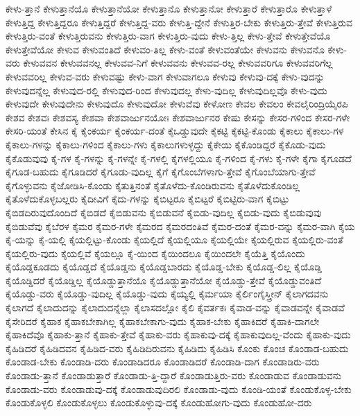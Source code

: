{ಕೇಳು-ತ್ತಾನೆ
ಕೇಳುತ್ತಾನೆಯೊ
ಕೇಳುತ್ತಾನೆಯೋ
ಕೇಳುತ್ತಾನೊ
ಕೇಳುತ್ತಾನೋ
ಕೇಳುತ್ತಾರೆ
ಕೇಳುತ್ತಾರೊ
ಕೇಳುತ್ತಾಳೆ
ಕೇಳುತ್ತಿದ್ದ
ಕೇಳುತ್ತಿದ್ದರೂ
ಕೇಳುತ್ತಿದ್ದರೆ
ಕೇಳುತ್ತಿದ್ದ-ವರು
ಕೇಳುತ್ತಿ-ದ್ದೇನೆ
ಕೇಳುತ್ತಿರ-ಬೇಕು
ಕೇಳುತ್ತಿರು-ತ್ತೇವೆ
ಕೇಳುತ್ತಿರುವ
ಕೇಳುತ್ತಿರು-ವಂತೆ
ಕೇಳುತ್ತಿರುವನು
ಕೇಳುತ್ತಿರು-ವಾಗ
ಕೇಳುತ್ತಿರು-ವುದು
ಕೇಳು-ತ್ತಿಲ್ಲ
ಕೇಳು-ತ್ತೇವೆ
ಕೇಳುತ್ತೇವೆಯೊ
ಕೇಳುತ್ತೇವೆಯೋ
ಕೇಳುವ
ಕೇಳುವಂತಿದೆ
ಕೇಳುವಂ-ತಿಲ್ಲ
ಕೇಳು-ವಂತೆ
ಕೇಳುವಂತೆಯೇ
ಕೇಳುವನು
ಕೇಳುವನೊ
ಕೇಳು-ವರು
ಕೇಳುವವನ
ಕೇಳುವವನಲ್ಲ
ಕೇಳುವವ-ನಿಗೆ
ಕೇಳುವವನು
ಕೇಳುವವ-ರಲ್ಲ
ಕೇಳುವವರಿಗೂ
ಕೇಳುವವರಿಗೆಲ್ಲ
ಕೇಳುವವರಿಲ್ಲ
ಕೇಳುವ-ವರು
ಕೇಳುವಷ್ಟು
ಕೇಳು-ವಾಗ
ಕೇಳುವಾಗಲೂ
ಕೇಳುವು
ಕೇಳುವು-ದಕ್ಕೆ
ಕೇಳು-ವುದನ್ನು
ಕೇಳುವುದನ್ನೆಲ್ಲ
ಕೇಳುವುದ-ರಲ್ಲಿ
ಕೇಳುವುದ-ರಿಂದ
ಕೇಳುವುದಲ್ಲ
ಕೇಳು-ವುದಿಲ್ಲ
ಕೇಳುವುದಿಲ್ಲವೊ
ಕೇಳು-ವುದು
ಕೇಳುವುದೇ
ಕೇಳುವುದೇನು
ಕೇಳುವುದೊ
ಕೇಳುವುದೋ
ಕೇಳುವೆವು
ಕೇಳೋಣ
ಕೇವಲ
ಕೇವಲಂ
ಕೇವಲೈರಿಂದ್ರಿಯೈರಪಿ
ಕೇಶವ
ಕೇಶವಃ
ಕೇಶವಸ್ಯ
ಕೇಶವಾ
ಕೇಶವಾರ್ಜುನಯೋಃ
ಕೇಶವಾರ್ಜುನರ
ಕೇಷು
ಕೇಸನ್ನು
ಕೇಸರ-ಗಳಿಂದ
ಕೇಸರ-ಗಳೇ
ಕೇಸರಿ-ಯಂತೆ
ಕೇಸಿನ
ಕೈ
ಕೈಂಕರ್ಯ
ಕೈಂಕರ್ಯ-ದಂತೆ
ಕೈಒಡ್ಡುವುದೇ
ಕೈಕಟ್ಟಿ
ಕೈಕಟ್ಟಿ-ಕೊಂಡು
ಕೈಕಾಲು
ಕೈಕಾಲು-ಗಳ
ಕೈಕಾಲು-ಗಳನ್ನು
ಕೈಕಾಲು-ಗಳಿಂದ
ಕೈಕಾಲು-ಗಳು
ಕೈಕಾಲುಗಳುಳ್ಳದ್ದು
ಕೈಕೇಯಿ
ಕೈಕೊಂಡಿದ್ದರೆ
ಕೈಕೊಡು-ವುದು
ಕೈಕೊಡುವುವು
ಕೈ-ಗಳ
ಕೈ-ಗಳನ್ನು
ಕೈ-ಗಳನ್ನೇ
ಕೈ-ಗಳಲ್ಲಿ
ಕೈಗಳಲ್ಲಿಯೂ
ಕೈ-ಗಳಿಂದ
ಕೈ-ಗಳು
ಕೈ-ಗಳೇ
ಕೈಗಾ
ಕೈಗೂಡದೆ
ಕೈಗೂಡ-ಬಹುದು
ಕೈಗೂಡಿದರೆ
ಕೈಗೂಡು-ವುದಿಲ್ಲ
ಕೈಗೆ
ಕೈಗೊಂಬೆಗಳಾಗು-ತ್ತೇವೆ
ಕೈಗೊಂಬೆಯಾಗು-ತ್ತೇವೆ
ಕೈಗೊಳ್ಳುವನು
ಕೈಜೋಡಿಸಿ-ಕೊಂಡು
ಕೈತುತ್ತಿನಂತೆ
ಕೈತೊಳೆದು-ಕೊಂಡಿರುವನು
ಕೈತೊಳೆದುಕೊಂಡಿಲ್ಲ
ಕೈತೊಳೆದುಕೊಳ್ಳಬಲ್ಲರು
ಕೈದೀವಿಗೆ
ಕೈದು-ಗಳನ್ನು
ಕೈಬಿಟ್ಟರೂ
ಕೈಬಿಟ್ಟರೆ
ಕೈಬಿಟ್ಟಿರು-ವಾಗ
ಕೈಬಿಟ್ಟು
ಕೈಬಿಡದಿರುವುದೊಂದಿದೆ
ಕೈಬಿಡದೆ
ಕೈಬಿಡುವನು
ಕೈಬಿಡುವನೆ
ಕೈಬಿಡು-ವುದಿಲ್ಲ
ಕೈಬಿಡು-ವುದು
ಕೈಬಿಡುವುವು
ಕೈಬಿಡುವೆವು
ಕೈಬೆರಳ
ಕೈಮರ
ಕೈಮರ-ಗಳೇ
ಕೈಮರದ
ಕೈಮರದಂತಿವೆ
ಕೈಮರ-ದಂತೆ
ಕೈಮರ-ವನ್ನು
ಕೈಮರ-ವಾಗಿ
ಕೈಯ
ಕೈ-ಯನ್ನು
ಕೈ-ಯಲ್ಲಿ
ಕೈಯಲ್ಲಿಟ್ಟು-ಕೊಂಡು
ಕೈಯಲ್ಲಿದೆ
ಕೈಯಲ್ಲಿಯೂ
ಕೈಯಲ್ಲಿಯೇ
ಕೈಯಲ್ಲಿರುವ
ಕೈಯಲ್ಲಿರು-ವಂತೆ
ಕೈಯಲ್ಲಿರು-ವುದು
ಕೈಯಲ್ಲಿವೆ
ಕೈಯಲ್ಲೂ
ಕೈ-ಯಿಂದ
ಕೈಯಿಂದಲೂ
ಕೈಯಿಂದಲೇ
ಕೈಯೆತ್ತಿ
ಕೈಯೊಂದು
ಕೈಯೊಡ್ಡಕೂಡದು
ಕೈಯೊಡ್ಡದೆ
ಕೈಯೊಡ್ಡನು
ಕೈಯೊಡ್ಡಬಾರದು
ಕೈಯೊಡ್ಡ-ಬೇಕು
ಕೈಯೊಡ್ಡ-ಲಿಲ್ಲ
ಕೈಯೊಡ್ಡಿ
ಕೈಯೊಡ್ಡಿದರೆ
ಕೈಯೊಡ್ಡಿಲ್ಲ
ಕೈಯೊಡ್ಡುತ್ತಾನೆಯೊ
ಕೈಯೊಡ್ಡುತ್ತಾನೆಯೋ
ಕೈಯೊಡ್ಡು-ತ್ತೇವೆ
ಕೈಯೊಡ್ಡುವಂತಿದೆ
ಕೈಯೊಡ್ಡು-ವರು
ಕೈಯೊಡ್ಡು-ವುದಿಲ್ಲ
ಕೈಯೊಡ್ಡು-ವುದು
ಕೈಯ್ಯಲ್ಲಿ
ಕೈರ್ಮಯಾ
ಕೈರ್ಲಿಂಗೈಸ್ತ್ರೀನ್
ಕೈಲಾಗದವನು
ಕೈಲಾಗದೆ
ಕೈಲಾದುದನ್ನು
ಕೈಲಾದುದನ್ನೆಲ್ಲಾ
ಕೈಲಾಸದಲ್ಲೋ
ಕೈಲಿ
ಕೈವರ್ತಕಃ
ಕೈವಾಡ-ವನ್ನು
ಕೈವಾಡವನ್ನೇ
ಕೈವಾಡವೆ
ಕೈಸೇರಿದರೆ
ಕೈಹಾಕ
ಕೈಹಾಕಬೇಕಾಗಿಲ್ಲ
ಕೈಹಾಕಬೇಕಾಗು-ವುದು
ಕೈಹಾಕ-ಬೇಕು
ಕೈಹಾಕಿದರೆ
ಕೈಹಾಕಿ-ದಾಗಲೇ
ಕೈಹಾಕಿದೆವೊ
ಕೈಹಾಕು-ತ್ತಾನೆ
ಕೈಹಾಕು-ತ್ತೇವೆ
ಕೈಹಾಕು-ವರು
ಕೈಹಾಕುವು-ದಕ್ಕೆ
ಕೈಹಾಕುವುದಿಲ್ಲ-ವೆಂದು
ಕೈಹಾಕು-ವುದು
ಕೈಹಿಡಿದರೆ
ಕೈಹಿಡಿದವನ
ಕೈಹಿಡಿದ-ವರು
ಕೈಹಿಡಿದಿರುವನು
ಕೈಹಿಡಿದು
ಕೈಹಿಡಿಸಿ
ಕೊಂಕು
ಕೊಂಚ
ಕೊಂಡಾಡ-ಬಹುದು
ಕೊಂಡಾಡ-ಬೇಕು
ಕೊಂಡಾಡಿ-ದರು
ಕೊಂಡಾಡಿದರೂ
ಕೊಂಡಾಡಿದರೆ
ಕೊಂಡಾಡಿ-ದಾಗ
ಕೊಂಡಾಡಿರು-ವರು
ಕೊಂಡಾಡು-ತ್ತಾನೆ
ಕೊಂಡಾಡುತ್ತಾರೆ
ಕೊಂಡಾಡು-ತ್ತಿ-ದ್ದಾರೆ
ಕೊಂಡಾಡುತ್ತಿರು-ವರು
ಕೊಂಡಾಡುವ
ಕೊಂಡಾಡುವನು
ಕೊಂಡಾಡು-ವರು
ಕೊಂಡಾಡುವು-ದಕ್ಕೆ
ಕೊಂಡಾಡುವುದಿರಲಿ
ಕೊಂಡಾಡು-ವುದು
ಕೊಂಡಿ-ಯಂತೆ
ಕೊಂಡುಕೊಳ್ಳ-ಬೇಕು
ಕೊಂಡುಕೊಳ್ಳಲಿ
ಕೊಂಡುಕೊಳ್ಳಲು
ಕೊಂಡುಕೊಳ್ಳುವು-ದಕ್ಕೆ
ಕೊಂಡುಹೋಗು-ವುದು
ಕೊಂಡುಹೋ-ದರು
}
